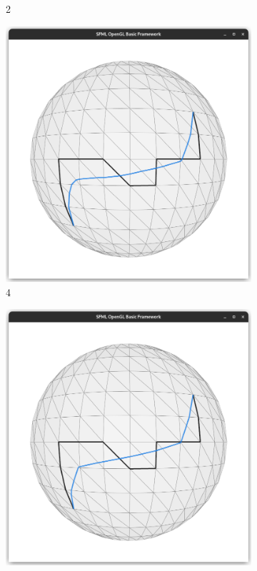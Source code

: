 \documentclass{stdlocal}
\begin{document}
\begin{figure}
\begin{subfigure}[b]{0.24\linewidth}
    \caption{2}
  \end{subfigure}
  \begin{subfigure}[b]{0.24\linewidth}
    \centering
    \includegraphics[width=\linewidth,trim={15px 20 15 50},clip]{images/sphere-geodesic-1-iteration-4.png}
    \caption{4}
  \end{subfigure}
  \begin{subfigure}[b]{0.24\linewidth}
    \centering
    \includegraphics[width=\linewidth,trim={15px 20 15 50},clip]{images/sphere-geodesic-1-iteration-8.png}

\end{subfigure}
\end{figure}
\end{document}
